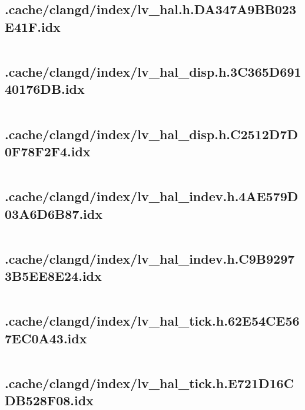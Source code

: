 \subsection{.cache/clangd/index/lv_hal.h.DA347A9BB023E41F.idx}
\inputminted[linenos,tabsize=2,breaklines, breakanywhere]{c}{lv_hal.h.DA347A9BB023E41F.idx}
\pagebreak

\subsection{.cache/clangd/index/lv_hal_disp.h.3C365D69140176DB.idx}
\inputminted[linenos,tabsize=2,breaklines, breakanywhere]{c}{lv_hal_disp.h.3C365D69140176DB.idx}
\pagebreak

\subsection{.cache/clangd/index/lv_hal_disp.h.C2512D7D0F78F2F4.idx}
\inputminted[linenos,tabsize=2,breaklines, breakanywhere]{c}{lv_hal_disp.h.C2512D7D0F78F2F4.idx}
\pagebreak

\subsection{.cache/clangd/index/lv_hal_indev.h.4AE579D03A6D6B87.idx}
\inputminted[linenos,tabsize=2,breaklines, breakanywhere]{c}{lv_hal_indev.h.4AE579D03A6D6B87.idx}
\pagebreak

\subsection{.cache/clangd/index/lv_hal_indev.h.C9B92973B5EE8E24.idx}
\inputminted[linenos,tabsize=2,breaklines, breakanywhere]{c}{lv_hal_indev.h.C9B92973B5EE8E24.idx}
\pagebreak

\subsection{.cache/clangd/index/lv_hal_tick.h.62E54CE567EC0A43.idx}
\inputminted[linenos,tabsize=2,breaklines, breakanywhere]{c}{lv_hal_tick.h.62E54CE567EC0A43.idx}
\pagebreak

\subsection{.cache/clangd/index/lv_hal_tick.h.E721D16CDB528F08.idx}
\inputminted[linenos,tabsize=2,breaklines, breakanywhere]{c}{lv_hal_tick.h.E721D16CDB528F08.idx}
\pagebreak

